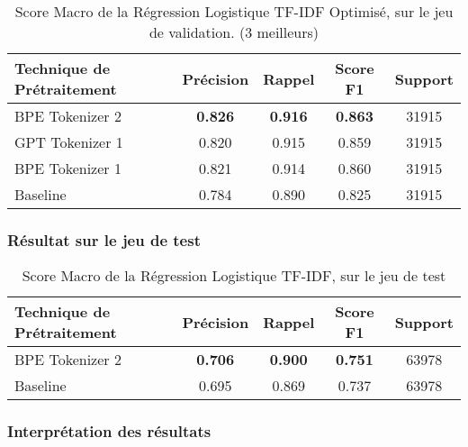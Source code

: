 \begin{table}[ht]
    \centering
    \caption{Score Macro de la Régression Logistique TF-IDF Optimisé, sur le jeu de validation. (3 meilleurs)}
    \begin{tabular}{lcccc}
    \hline
    \textbf{Technique de Prétraitement} & \textbf{Précision} & \textbf{Rappel} & \textbf{Score F1} & \textbf{Support} \\ \hline
    BPE Tokenizer 2                          & \textbf{0.826}              & \textbf{0.916}           & \textbf{0.863}             & 31915            \\
    GPT Tokenizer 1                          & 0.820              & 0.915           & 0.859             & 31915            \\
    BPE Tokenizer 1                           & 0.821              & 0.914           & 0.860             & 31915            \\ \hline
    Baseline             & 0.784             & 0.890           & 0.825             & 31915            \\ \hline
\end{tabular}
\label{tab:results}
\end{table}


\subsubsection{Résultat sur le jeu de test}
\begin{table}[ht]
    \centering
    \caption{Score Macro de la Régression Logistique TF-IDF, sur le jeu de test}
    \begin{tabular}{lcccc}
    \hline
    \textbf{Technique de Prétraitement} & \textbf{Précision} & \textbf{Rappel} & \textbf{Score F1} & \textbf{Support} \\ \hline
    BPE Tokenizer 2                          & \textbf{0.706}              & \textbf{0.900}           & \textbf{0.751}            & 63978            \\\hline
    Baseline                               & 0.695              & 0.869           & 0.737             & 63978            \\ \hline
\end{tabular}
\label{tab:results}
\end{table}

\subsubsection{Interprétation des résultats}
